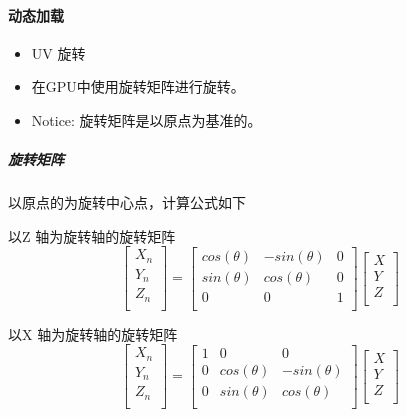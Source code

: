 \documentclass[UTF8,a4paper,12pt]{ctexbook}
\begin{document}
		 \paragraph{动态加载}
			\begin{itemize}
				\item UV 旋转
				\item 在GPU中使用旋转矩阵进行旋转。
				\item Notice: 旋转矩阵是以原点为基准的。
			\end{itemize}
			\subparagraph{旋转矩阵}以原点的为旋转中心点，计算公式如下

			以Z 轴为旋转轴的旋转矩阵
				$$
				\left[
					\begin{array}{c}
						X_n\\
						Y_n\\
						Z_n\\		
					\end{array}
				\right]	
				= \left[
					\begin{array}{ccc}
						cos(\theta) & -sin(\theta) & 0\\
						sin(\theta) & cos(\theta) & 0\\
						0 & 0 & 1\\
					\end{array}
				\right]
				\left[
					\begin{array}{c}
						X\\
						Y\\
						Z\\		
					\end{array}
				\right]	
				$$

			以X 轴为旋转轴的旋转矩阵
				$$
				\left[
				\begin{array}{c}
				X_n\\
				Y_n\\
				Z_n\\		
				\end{array}
				\right]	
				= \left[
				\begin{array}{ccc}
				1 & 0 & 0\\
				0 & cos(\theta) & -sin(\theta)\\
				0 & sin(\theta) & cos(\theta)\\
				\end{array}
				\right]
				\left[
				\begin{array}{c}
				X\\
				Y\\
				Z\\		
				\end{array}
				\right]	
				$$				
\end{document}
